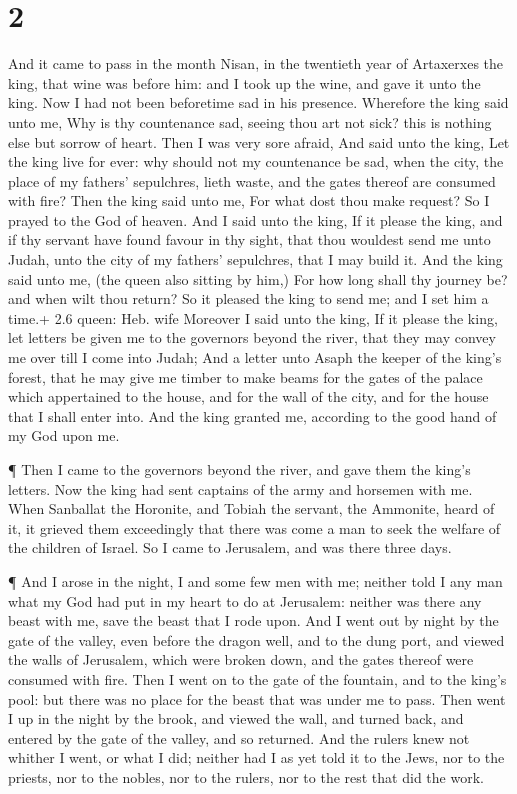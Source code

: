 \hypertarget{section-1}{%
\section{2}\label{section-1}}

 And it came to pass in the month Nisan, in the twentieth
year of Artaxerxes the king, that wine was before him: and I took up the
wine, and gave it unto the king. Now I had not been beforetime sad in
his presence.  Wherefore the king said unto me, Why is thy
countenance sad, seeing thou art not sick? this is nothing else but
sorrow of heart. Then I was very sore afraid,  And said unto
the king, Let the king live for ever: why should not my countenance be
sad, when the city, the place of my fathers' sepulchres, lieth waste,
and the gates thereof are consumed with fire?  Then the king
said unto me, For what dost thou make request? So I prayed to the God of
heaven.  And I said unto the king, If it please the king,
and if thy servant have found favour in thy sight, that thou wouldest
send me unto Judah, unto the city of my fathers' sepulchres, that I may
build it.  And the king said unto me, (the queen also
sitting by him,) For how long shall thy journey be? and when wilt thou
return? So it pleased the king to send me; and I set him a time.+ 2.6
queen: Heb. wife  Moreover I said unto the king, If it
please the king, let letters be given me to the governors beyond the
river, that they may convey me over till I come into Judah; 
And a letter unto Asaph the keeper of the king's forest, that he may
give me timber to make beams for the gates of the palace which
appertained to the house, and for the wall of the city, and for the
house that I shall enter into. And the king granted me, according to the
good hand of my God upon me.

 ¶ Then I came to the governors beyond the river, and gave
them the king's letters. Now the king had sent captains of the army and
horsemen with me.  When Sanballat the Horonite, and Tobiah
the servant, the Ammonite, heard of it, it grieved them exceedingly that
there was come a man to seek the welfare of the children of Israel.
 So I came to Jerusalem, and was there three days.

 ¶ And I arose in the night, I and some few men with me;
neither told I any man what my God had put in my heart to do at
Jerusalem: neither was there any beast with me, save the beast that I
rode upon.  And I went out by night by the gate of the
valley, even before the dragon well, and to the dung port, and viewed
the walls of Jerusalem, which were broken down, and the gates thereof
were consumed with fire.  Then I went on to the gate of the
fountain, and to the king's pool: but there was no place for the beast
that was under me to pass.  Then went I up in the night by
the brook, and viewed the wall, and turned back, and entered by the gate
of the valley, and so returned.  And the rulers knew not
whither I went, or what I did; neither had I as yet told it to the Jews,
nor to the priests, nor to the nobles, nor to the rulers, nor to the
rest that did the work.

